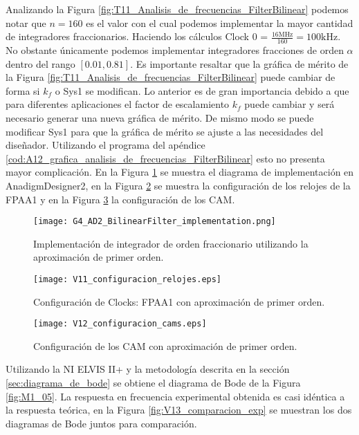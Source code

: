 	Analizando la Figura \ref{fig:T11_Analisis_de_frecuencias_FilterBilinear} podemos notar que $n = 160$ es el valor con el cual podemos implementar la mayor cantidad de integradores fraccionarios. Haciendo los cálculos Clock 0 = $\frac{16 \mathrm{MHz}}{160} = 100 \mathrm{kHz}$. No obstante únicamente podemos implementar integradores fracciones de orden $\alpha$ dentro del rango $[0.01, 0.81]$. Es importante resaltar que la gráfica de mérito de la Figura \ref{fig:T11_Analisis_de_frecuencias_FilterBilinear} puede cambiar de forma si $k_{f}$ o Sys1 se modifican. Lo anterior es de gran importancia debido a que para diferentes aplicaciones el factor de escalamiento $k_{f}$ puede cambiar y será necesario generar una nueva gráfica de mérito. De mismo modo se puede modificar Sys1 para que la gráfica de mérito se ajuste a las necesidades del diseñador. Utilizando el programa del apéndice \ref{cod:A12_grafica_analisis_de_frecuencias_FilterBilinear} esto no presenta mayor complicación. En la Figura \ref{fig:G4_AD2_BilinearFilter_implementation} se muestra el diagrama de implementación en AnadigmDesigner2, en la Figura \ref{fig:V11_configuracion_relojes} se muestra la configuración de los relojes de la FPAA1 y en la Figura \ref{fig:V12_configuracion_cams} la configuración de los CAM.

	\begin{figure}[!ht] 
		\caption{Implementación de integrador de orden fraccionario utilizando la aproximación de primer orden.}
		\label{fig:G4_AD2_BilinearFilter_implementation}
		\centering
		\texttt{[image: G4\_AD2\_BilinearFilter\_implementation.png]}
	\end{figure}
	
	\begin{figure}[!ht] 
		\caption{Configuración de Clocks: FPAA1 con aproximación de primer orden.}
		\label{fig:V11_configuracion_relojes}
		\centering
		\texttt{[image: V11\_configuracion\_relojes.eps]}
	\end{figure}
	
	\begin{figure}[!ht] 
		\caption{Configuración de los CAM con aproximación de primer orden.}
		\label{fig:V12_configuracion_cams}
		\centering
		\texttt{[image: V12\_configuracion\_cams.eps]}
	\end{figure}
	
	Utilizando la NI ELVIS II+ y la metodología descrita en la sección \ref{sec:diagrama_de_bode} se obtiene el diagrama de Bode de la Figura \ref{fig:M1_05}. La respuesta en frecuencia experimental obtenida es casi idéntica a la respuesta teórica, en la Figura \ref{fig:V13_comparacion_exp} se muestran los dos diagramas de Bode juntos para comparación.
	

